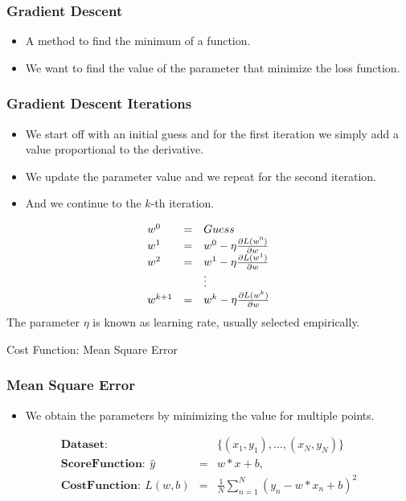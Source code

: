 \documentclass[14 pt]{beamer}
\let\olditem\item
\renewcommand{\item}{\olditem\vspace{4pt}}
\begin{document}
\begin{frame}
  \frametitle{Gradient Descent}
  \begin{itemize}
  \item A method to find the minimum of a function.
  \item We want to find the value of the parameter that minimize the loss function.
  \end{itemize}
\end{frame}

\begin{frame}
    \frametitle{Gradient Descent Iterations}
    \begin{itemize}
    \item We start off with an initial guess and for the first iteration we
      simply add a value proportional to the derivative.
    \item We update the parameter value and we repeat for the second
      iteration.
    \item And we continue to the $k$-th iteration.
    \end{itemize}
  \end{frame}
  \begin{frame}
\begin{displaymath}
    \begin{array}{{lll}}
      w^0  & =  & Guess \\
      w^1 & = & w^0 - \eta \frac{\partial L(w^0)}{\partial w} \\
      w^2 & = & w^1 - \eta \frac{\partial L(w^1)}{\partial w} \\      
&  & \vdots  \\
w^{k+1} & = & w^k - \eta \frac{\partial L(w^k)}{\partial w} \\
    \end{array}
  \end{displaymath}
The parameter $\eta$ is known as learning rate, usually selected empirically.
\end{frame}

\begin{frame}
\begin{center}
\Large{Cost Function: Mean Square Error}
\end{center}
\end{frame}

\begin{frame}[fragile]
  \frametitle{Mean Square Error}
  \begin{itemize}
  \item We obtain the parameters by minimizing the value for multiple points.
  \end{itemize}
  \begin{displaymath}
\begin{array}{lll}
\mathbf{Dataset}  : & &  \{(x_1,y_1), \ldots, (x_N, y_N)\} \\
   \mathbf{Score Function}  :   \ \hat{y}  & = &  w*x + b,  \\
\mathbf{Cost Function}  :  \ L(w,b)  & = & \frac{1}{N} \sum_{n=1}^{N} (y_n - w*x_n+b)^2 
\end{array}
\end{displaymath}
\end{frame}
\end{document}
